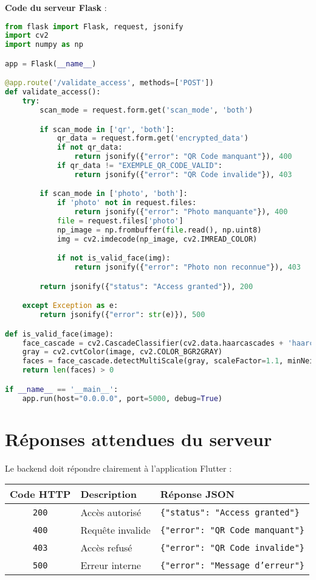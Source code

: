 \documentclass[a4paper,12pt]{article}
\begin{document}
\textbf{Code du serveur Flask} :
\begin{lstlisting}[language=python]
from flask import Flask, request, jsonify
import cv2
import numpy as np

app = Flask(__name__)

@app.route('/validate_access', methods=['POST'])
def validate_access():
    try:
        scan_mode = request.form.get('scan_mode', 'both')

        if scan_mode in ['qr', 'both']:
            qr_data = request.form.get('encrypted_data')
            if not qr_data:
                return jsonify({"error": "QR Code manquant"}), 400
            if qr_data != "EXEMPLE_QR_CODE_VALID":
                return jsonify({"error": "QR Code invalide"}), 403

        if scan_mode in ['photo', 'both']:
            if 'photo' not in request.files:
                return jsonify({"error": "Photo manquante"}), 400
            file = request.files['photo']
            np_image = np.frombuffer(file.read(), np.uint8)
            img = cv2.imdecode(np_image, cv2.IMREAD_COLOR)

            if not is_valid_face(img):
                return jsonify({"error": "Photo non reconnue"}), 403

        return jsonify({"status": "Access granted"}), 200

    except Exception as e:
        return jsonify({"error": str(e)}), 500

def is_valid_face(image):
    face_cascade = cv2.CascadeClassifier(cv2.data.haarcascades + 'haarcascade_frontalface_default.xml')
    gray = cv2.cvtColor(image, cv2.COLOR_BGR2GRAY)
    faces = face_cascade.detectMultiScale(gray, scaleFactor=1.1, minNeighbors=5)
    return len(faces) > 0

if __name__ == '__main__':
    app.run(host="0.0.0.0", port=5000, debug=True)
\end{lstlisting}

\section{Réponses attendues du serveur}

Le backend doit répondre clairement à l'application Flutter :

\begin{center}
\begin{tabular}{|c|l|l|}
\hline
\textbf{Code HTTP} & \textbf{Description} & \textbf{Réponse JSON} \\
\hline
\texttt{200} & Accès autorisé & \texttt{\{"status": "Access granted"\}} \\
\hline
\texttt{400} & Requête invalide & \texttt{\{"error": "QR Code manquant"\}} \\
\hline
\texttt{403} & Accès refusé & \texttt{\{"error": "QR Code invalide"\}} \\
\hline
\texttt{500} & Erreur interne & \texttt{\{"error": "Message d'erreur"\}} \\
\hline
\end{tabular}
\end{center}
\end{document}
